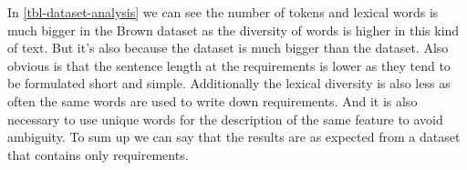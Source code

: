 In \autoref{tbl-dataset-analysis} we can see the number of tokens and lexical words is much bigger in the Brown dataset as the diversity of words is higher in this kind of text. But it's also because the dataset is much bigger than the \crowdre{} dataset. Also obvious is that the sentence length at the requirements is lower as they tend to be formulated short and simple. Additionally the lexical diversity is also less as often the same words are used to write down requirements. And it is also necessary to use unique words for the description of the same feature to avoid ambiguity. To sum up we can say that the results are as expected from a dataset that contains only requirements.


